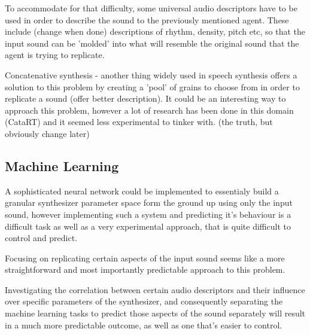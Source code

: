 To accommodate for that difficulty, some universal audio descriptors have to be
used in order to describe the sound to the previously mentioned agent. These
include (change when done) descriptions of rhythm, density, pitch etc, so that
the input sound can be 'molded' into what will resemble the original sound that
the agent is trying to replicate.

Concatenative synthesis - another thing widely used in speech synthesis offers a
solution to this problem by creating a 'pool' of grains to choose from in order
to replicate a sound (offer better description). It could be an interesting way
to approach this problem, however a lot of research has been done in this domain
(CataRT) and it seemed less experimental to tinker with. (the truth, but
obviously change later)

\subsection{Machine Learning}

A sophisticated neural network could be implemented to essentialy build a
granular synthesizer parameter space form the ground up using only the input
sound, however implementing such a system and predicting it's behaviour is a
difficult task as well as a very experimental approach, that is quite difficult
to control and predict.

Focusing on replicating certain aspects of the input sound seems like a more
straightforward and most importantly predictable approach to this problem.

Investigating the correlation between certain audio descriptors and their
influence over specific parameters of the synthesizer, and consequently
separating the machine learning tasks to predict those aspects of the sound
separately will result in a much more predictable outcome, as well as one that's
easier to control.
